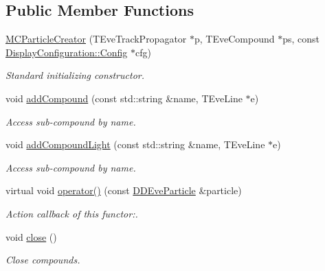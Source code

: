 \subsection*{Public Member Functions}
\begin{DoxyCompactItemize}
\item 
\hyperlink{struct_d_d4hep_1_1_m_c_particle_creator_a2fcb384a14cbc919c57f6774cf6c20f3}{MCParticleCreator} (TEveTrackPropagator $\ast$p, TEveCompound $\ast$ps, const \hyperlink{class_d_d4hep_1_1_display_configuration_1_1_config}{DisplayConfiguration::Config} $\ast$cfg)
\begin{DoxyCompactList}\small\item\em Standard initializing constructor. \item\end{DoxyCompactList}\item 
void \hyperlink{struct_d_d4hep_1_1_m_c_particle_creator_a282bb825147fa28733679bc6ed5a9afe}{addCompound} (const std::string \&name, TEveLine $\ast$e)
\begin{DoxyCompactList}\small\item\em Access sub-\/compound by name. \item\end{DoxyCompactList}\item 
void \hyperlink{struct_d_d4hep_1_1_m_c_particle_creator_a7b64ce56bb99131d20afbccf27760828}{addCompoundLight} (const std::string \&name, TEveLine $\ast$e)
\begin{DoxyCompactList}\small\item\em Access sub-\/compound by name. \item\end{DoxyCompactList}\item 
virtual void \hyperlink{struct_d_d4hep_1_1_m_c_particle_creator_a42ebf0f3d55a5f02d9617ccf7aaf550a}{operator()} (const \hyperlink{class_d_d4hep_1_1_d_d_eve_particle}{DDEveParticle} \&particle)
\begin{DoxyCompactList}\small\item\em Action callback of this functor:. \item\end{DoxyCompactList}\item 
void \hyperlink{struct_d_d4hep_1_1_m_c_particle_creator_aa238c6f5a187841abb59e61db1c3ddf9}{close} ()
\begin{DoxyCompactList}\small\item\em Close compounds. \item\end{DoxyCompactList}\end{DoxyCompactItemize}
